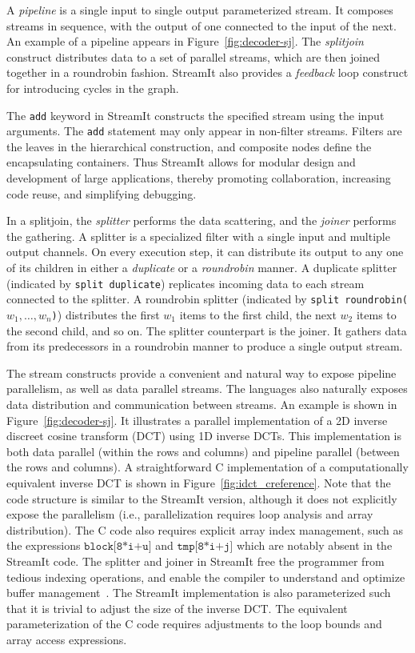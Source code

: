 \vspace{-11pt}

A {\it pipeline} is a single input to single output parameterized
stream. It composes streams in sequence, with the output of one
connected to the input of the next.  An example of a pipeline appears
in Figure~\ref{fig:decoder-sj}. The {\it splitjoin} construct
distributes data to a set of parallel streams, which are then joined
together in a roundrobin fashion.  StreamIt also provides a {\it
feedback} loop construct for introducing cycles in the graph.

The {\tt add} keyword in StreamIt constructs the specified stream
using the input arguments. The {\tt add} statement may only appear in
non-filter streams.  Filters are the leaves in the hierarchical
construction, and composite nodes define the encapsulating
containers. Thus StreamIt allows for modular design and development of large
applications, thereby  promoting collaboration, increasing code reuse,
and simplifying debugging.

In a splitjoin, the {\it splitter} performs the data scattering, and
the {\it joiner} performs the gathering. A splitter is a specialized
filter with a single input and multiple output channels. On every
execution step, it can distribute its output to any one of its
children in either a {\it duplicate} or a {\it roundrobin} manner.  A
duplicate splitter (indicated by \texttt{split duplicate}) replicates
incoming data to each stream connected to the splitter.  A roundrobin
splitter (indicated by {\tt split roundrobin($w_1,\ldots,w_n$)})
distributes the first $w_1$ items to the first child, the next $w_2$
items to the second child, and so on.  The splitter counterpart is the
joiner.  It gathers data from its predecessors in a roundrobin manner
to produce a single output stream.

The stream constructs provide a convenient and natural way to expose
pipeline parallelism, as well as data parallel streams. The languages
also naturally exposes data distribution and communication between
streams. An example is shown in Figure~\ref{fig:decoder-sj}. It
illustrates a parallel implementation of a 2D inverse discreet cosine
transform (DCT) using 1D inverse DCTs. This implementation is both
data parallel (within the rows and columns) and pipeline parallel
(between the rows and columns).  A straightforward C implementation of
a computationally equivalent inverse DCT is shown in
Figure~\ref{fig:idct_creference}. Note that the code structure is
similar to the StreamIt version, although it does not explicitly
expose the parallelism (i.e., parallelization requires loop analysis
and array distribution).  The C code also requires explicit array
index management, such as the  expressions $\texttt{block[8*i+u]}$ and
$\texttt{tmp[8*i+j]}$ which are notably absent in the StreamIt code.
The splitter and joiner in StreamIt free the programmer from tedious
indexing operations, and enable the compiler to understand and
optimize buffer management~\cite{sermulins05lctes}. The StreamIt
implementation is also parameterized such that it is trivial to adjust
the size of the inverse DCT. The equivalent parameterization of the C
code requires adjustments to the loop bounds and array access
expressions.

